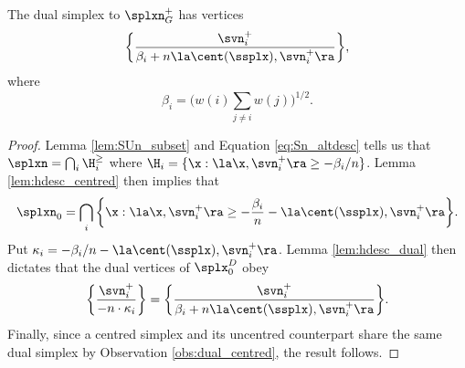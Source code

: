 
\begin{corollary}
	\label{cor:dual_Sn}
	The dual simplex to $\splxn_G^+$ has vertices 
	\begin{equation*}
	\bigg\{\frac{\svn_i^+}{\beta_i + n\la \cent(\ssplx),\svn_i^+\ra}\bigg\},
	\end{equation*}
	where 
	\[\beta_i = \bigg(w(i)\sum_{j\neq i}w(j)\bigg)^{1/2}.\]
\end{corollary}
\begin{proof}
	Lemma \ref{lem:SUn_subset} and Equation \eqref{eq:Sn_altdesc} tells us that $\splxn = \bigcap_i \H_i^\geq $ where  $\H_i = \{\x:\la \x,\svn^+_i\ra \geq -\beta_i/n\}$. Lemma \ref{lem:hdesc_centred} then implies that 
	\begin{equation*}
	\splxn_0 = \bigcap_i \bigg\{\x:\la \x,\svn_i^+\ra \geq -\frac{\beta_i}{n} - \la \cent(\ssplx),\svn_i^+\ra\bigg\}.
	\end{equation*}
	Put $\kappa_i = -\beta_i/n - \la \cent(\ssplx),\svn_i^+\ra$. 
	Lemma \ref{lem:hdesc_dual} then dictates that the dual vertices of $\splx_0^D$ obey 
	\begin{equation*}
	\bigg\{\frac{\svn_i^+}{-n\cdot \kappa_i}\bigg\} = 	\bigg\{\frac{\svn_i^+}{\beta_i + n\la \cent(\ssplx),\svn_i^+\ra}\bigg\}.
	\end{equation*}
	Finally, since a centred simplex and its uncentred counterpart share the same dual simplex by Observation \ref{obs:dual_centred}, the result follows. 
\end{proof}





